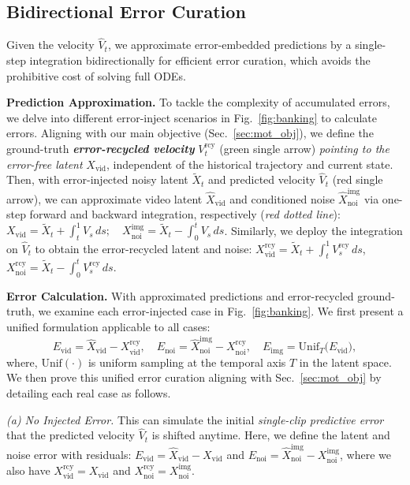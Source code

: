 \documentclass{article} %
\newcommand\vid{\mathrm{vid}}
\newcommand\rcy{\mathrm{rcy}}
\newcommand\noi{\mathrm{noi}}
\newcommand\img{\mathrm{img}}
\newcommand{\err}{E}
\newcommand{\samp}{\mathrm{Unif}}
\newcommand{\highlight}[1]{\textbf{\emph{#1}}}
\begin{document}
\subsection{Bidirectional Error Curation}\label{sec:method_bank}
Given the velocity $\hat{V}_t$, we approximate error-embedded predictions by a single-step integration bidirectionally for efficient error curation, which avoids the prohibitive cost of solving full ODEs.

\textbf{Prediction Approximation.} To tackle the complexity of accumulated errors, we delve into different error-inject scenarios in Fig.~\ref{fig:banking} to calculate errors. Aligning with our main objective (Sec.~\ref{sec:mot_obj}), we define the ground-truth \highlight{error-recycled velocity} $V^\rcy_{t}$ (green single arrow) \emph{pointing to the error-free latent} $X_\vid$, independent of the historical trajectory and current state. Then, with error-injected noisy latent $\tilde{X}_{t}$ and predicted velocity $\hat{V}_t$ (red single arrow), we can approximate video latent $\hat{X}_\vid$ and conditioned noise $ \hat{X}^\img_\noi$ via one-step forward and backward integration, respectively (\emph{{red 
dotted line}}): $X_\vid = \tilde{X}_t + \int_t^1 V_s\, ds;\quad {X}^\img_\noi = \tilde{X}_t - \int_0^t V_s\, ds$. Similarly, we deploy the integration on $\hat{V}_{t}$ to obtain the error-recycled latent and noise: $X^\rcy_\vid = \tilde{X}_t + \int_t^1 {V}^\rcy_s\, ds$, $X^\rcy_\noi = \tilde{X}_t - \int_0^t V^\rcy_s\, ds $. 

\noindent\textbf{Error Calculation.} With approximated predictions and error-recycled ground-truth, we examine each error-injected case in Fig.~\ref{fig:banking}. We first present a unified formulation applicable to all cases:
\begin{equation}\label{eq:error_cal}
\err_\vid = \hat{X}_\vid - X^\rcy_\vid, \quad \err_\noi = \hat{X}^\img_\noi - X^\rcy_\noi, \quad \err_\img = \samp_T({\err_\vid) },
\end{equation}
where, $\samp(\cdot)$ is uniform sampling at the temporal axis $T$ in the latent space. We then prove this unified error curation aligning with Sec.~\ref{sec:mot_obj} by detailing each real case as follows.

\vspace{-3pt}
\emph{(a) No Injected Error.} This can simulate the initial \emph{single-clip predictive error} that the predicted velocity $\hat{V}_t$ is shifted anytime. Here, we define the latent and noise error with residuals: $\err_\vid = \hat{X}_\vid -X_\vid $ and $\err_\noi = \hat{X}_\noi^\img -X_\noi^\img $, where we also have $X^\rcy_\vid = X_\vid$ and $X^\rcy_\noi = X_\noi^\img$. 
\end{document}
